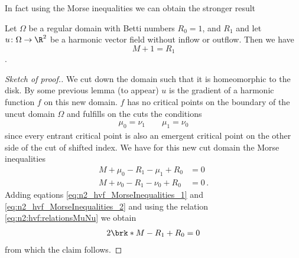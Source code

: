 In fact using the Morse inequalities we can obtain the stronger result
\begin{proposition}
  Let $\Omega$ be a regular domain with Betti numbers $R_0=1$, and $R_1$ and let $u\colon\Omega\to\R^2$ be 
  a harmonic vector field without inflow or outflow.
  Then we have $$M+1=R_1$$.
\end{proposition}
\begin{proof}[Sketch of proof.]
  We cut down the domain such that it is homeomorphic to the disk. By some previous lemma (to appear)
   $u$ is the gradient of a harmonic function $f$ on this new domain.
  $f$ has no critical points on the boundary of the uncut domain $\Omega$ and fulfills on the cuts the conditions
  \begin{align}
    \mu_0=\nu_1 \qquad \mu_1=\nu_0 \label{eq:n2:hvf:relationsMuNu}
  \end{align}
  since every entrant critical point is also an emergent critical point on the other side of the cut of shifted index.
  We have for this new cut domain the Morse inequalities
  \begin{align}
    M+\mu_0-R_1-\mu_1+R_0&=0 \label{eq:n2_hvf_MorseInequalities_1}\\
    M+\nu_0-R_1-\nu_0+R_0&=0\,. \label{eq:n2_hvf_MorseInequalities_2}
  \end{align}
  Adding eqations \eqref{eq:n2_hvf_MorseInequalities_1} and \eqref{eq:n2_hvf_MorseInequalities_2} and using the relation
  \eqref{eq:n2:hvf:relationsMuNu} we obtain
  \begin{align*}
    2\brk*{M-R_1+R_0}=0
  \end{align*}
  from which the claim follows.
\end{proof}

